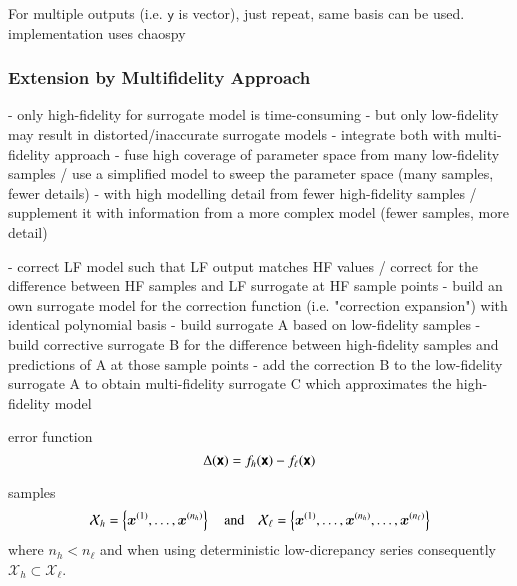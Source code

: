 
For multiple outputs (i.e. $\mathsf{y}$ is vector), just repeat, same basis can be used.
implementation uses chaospy \cite{feinberg_chaospy_2015}



\subsubsection{Extension by Multifidelity Approach}
\label{sec:multifidelity}


- only high-fidelity for surrogate model is time-consuming
- but only low-fidelity may result in distorted/inaccurate surrogate models \cite{ng_multifidelity_2012}
- integrate both with multi-fidelity approach
- fuse high coverage of parameter space from many low-fidelity samples / use a simplified model to sweep the parameter space (many samples, fewer details)
- with high modelling detail from fewer high-fidelity samples / supplement it with information from a more complex model (fewer samples, more detail)


- correct LF model such that LF output matches HF values / correct for the difference between HF samples and LF surrogate at HF sample points
- build an own surrogate model for the correction function (i.e. "correction expansion") with identical polynomial basis
- build surrogate A based on low-fidelity samples
- build corrective surrogate B for the difference between high-fidelity samples and predictions of A at those sample points
- add the correction B to the low-fidelity surrogate A to obtain multi-fidelity surrogate C which approximates the high-fidelity model

error function
\begin{equation}
    \Delta(\boldsymbol{\mathsf{x}}) = f_h(\boldsymbol{\mathsf{x}}) - f_\ell(\boldsymbol{\mathsf{x}})
\end{equation}

samples
\begin{equation}
    \mathcal{X}_h = \left\{ \bm{x}^{(1)}, \dots, \bm{x}^{(n_h)}\right\} \quad\text{and}\quad
    \mathcal{X}_\ell = \left\{ \bm{x}^{(1)}, \dots, \bm{x}^{(n_h)}, \dots, \bm{x}^{(n_\ell)}\right\}
\end{equation}
where $n_h < n_\ell$ and when using deterministic low-dicrepancy series
consequently $\mathcal{X}_h \subset \mathcal{X}_\ell$.

